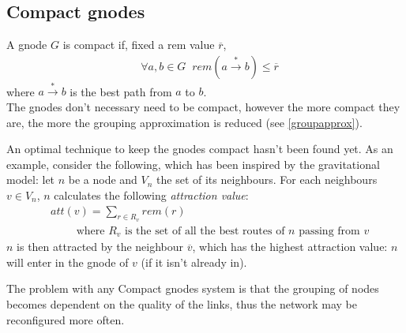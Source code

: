 \documentclass[a4paper]{article}
\newcommand{\T}[1]{\textrm{#1}}
\newcommand{\eal}[1]{{\begin{align*} #1 \end{align*}}}
\def\ove#1{{\overline{#1}}}
\newcommand{\qq}{\qquad}
\begin{document}
\subsection{Compact gnodes}
A gnode $G$ is compact if, fixed a rem value $\ove r$, 
\eal{&\forall a,b\in G\;\;rem(a\stackrel{*}{\rightarrow} b)\le \ove r}
where $a\stackrel{*}{\rightarrow} b$ is the best path from $a$ to $b$.\\
The gnodes don't necessary need to be compact, however the more compact they
are, the more the grouping approximation is reduced (see \ref{groupapprox}).

An optimal technique to keep the gnodes compact hasn't been found yet. As an
example, consider the following, which has been inspired by the gravitational
model: let $n$ be a node and $V_n$ the set of its
neighbours. For each neighbours $v\in V_n$, $n$ calculates the following
\emph{attraction value}:
\eal{&att(v) = \sum_{r\in R_v} rem(r)\\
&\qq\T{ where $R_v$ is the set of all the best routes of $n$ passing from $v$}
}
$n$ is then attracted by the neighbour $\ove v$, which has the highest
attraction value: $n$ will enter in the gnode of $v$ (if it isn't already in).

The problem with any Compact gnodes system is that the grouping of nodes
becomes dependent on the quality of the links, thus the network may be
reconfigured more often.
\end{document}
